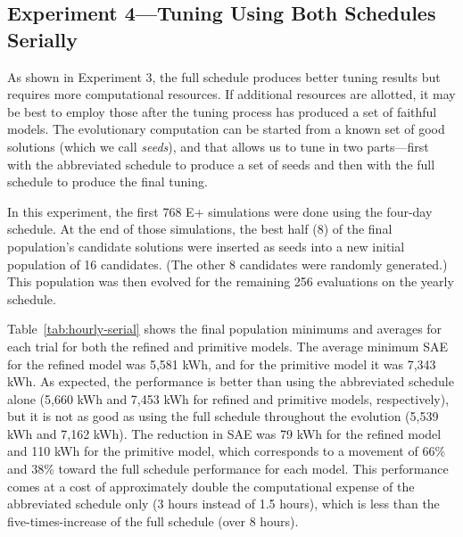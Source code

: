 \documentclass[preprint, review, 12pt]{elsarticle}
\begin{document}
\subsection{Experiment 4---Tuning Using Both Schedules Serially}
\label{sub:experiment4}
As shown in Experiment 3, the full schedule produces better tuning results but requires more computational resources. If additional resources are allotted, it may be best to employ those after the tuning process has produced a set of faithful models. The evolutionary computation can be started from a known set of good solutions (which we call \emph{seeds}), and that allows us to tune in two parts---first with the abbreviated schedule to produce a set of seeds and then with the full schedule to produce the final tuning.

In this experiment, the first 768 E+ simulations were done using the four-day schedule. At the end of those simulations, the best half (8) of the final population's candidate solutions were inserted as seeds into a new initial population of 16 candidates. (The other 8 candidates were randomly generated.) This population was then evolved for the remaining 256 evaluations on the yearly schedule.

Table~\ref{tab:hourly-serial} shows the final population minimums and averages for each trial for both the refined and primitive models. The average minimum SAE for the refined model was 5,581 kWh, and for the primitive model it was 7,343 kWh. As expected, the performance is better than using the abbreviated schedule alone (5,660 kWh and 7,453 kWh for refined and primitive models, respectively), but it is not as good as using the full schedule throughout the evolution (5,539 kWh and 7,162 kWh). The reduction in SAE was 79 kWh for the refined model and 110 kWh for the primitive model, which corresponds to a movement of 66\% and 38\% toward the full schedule performance for each model. This performance comes at a cost of approximately double the computational expense of the abbreviated schedule only (3 hours instead of 1.5 hours), which is less than the five-times-increase of the full schedule (over 8 hours). 
\end{document}

